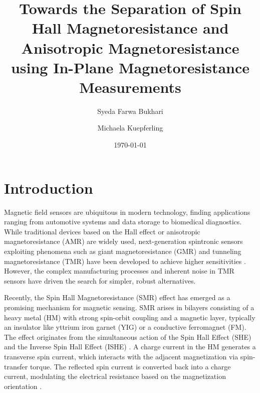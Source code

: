 \documentclass[11pt,a4paper]{article}
\title{Towards the Separation of Spin Hall Magnetoresistance and Anisotropic Magnetoresistance using In-Plane Magnetoresistance Measurements}
\author[1,2]{Syeda Farwa Bukhari}
\author[1]{Michaela Kuepferling}
\affil[1]{Istituto Nazionale di Ricerca Metrologica, Torino, Italy}
\affil[2]{DISAT, Politecnico di Torino, Torino, Italy}
\date{\today}
\begin{document}
\maketitle


\section{Introduction}
Magnetic field sensors are ubiquitous in modern technology, finding applications ranging from automotive systems and data storage to biomedical diagnostics. While traditional devices based on the Hall effect or anisotropic magnetoresistance (AMR) are widely used, next-generation spintronic sensors exploiting phenomena such as giant magnetoresistance (GMR) and tunneling magnetoresistance (TMR) have been developed to achieve higher sensitivities \cite{farwa_2026}. However, the complex manufacturing processes and inherent noise in TMR sensors have driven the search for simpler, robust alternatives. 

Recently, the Spin Hall Magnetoresistance (SMR) effect has emerged as a promising mechanism for magnetic sensing. SMR arises in bilayers consisting of a heavy metal (HM) with strong spin-orbit coupling and a magnetic layer, typically an insulator like yttrium iron garnet (YIG) or a conductive ferromagnet (FM). The effect originates from the simultaneous action of the Spin Hall Effect (SHE) and the Inverse Spin Hall Effect (ISHE) \cite{chen2016theory}. A charge current in the HM generates a transverse spin current, which interacts with the adjacent magnetization via spin-transfer torque. The reflected spin current is converted back into a charge current, modulating the electrical resistance based on the magnetization orientation \cite{chen2016theory, baldrati2018full, fischer2018spin}.
\end{document}
